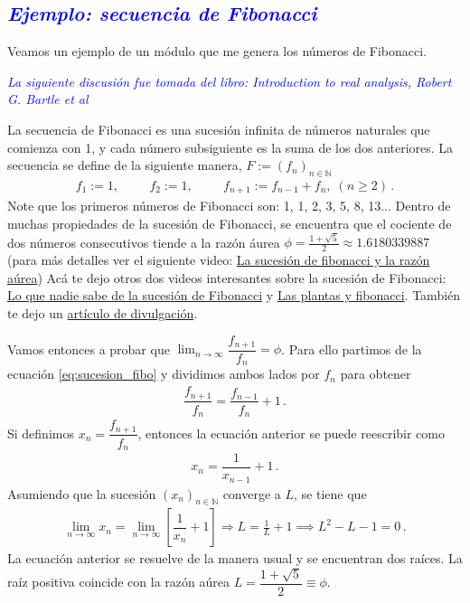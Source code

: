 \documentclass[12pt]{article}
\begin{document}
\subsection*{\textcolor{blue}{\textit{Ejemplo: secuencia de Fibonacci}}}

Veamos un ejemplo de un módulo que me genera los números de Fibonacci. 

	\noindent \textcolor{blue}{\textit{La siguiente discusión fue tomada del libro: 
	Introduction to real analysis, Robert G. Bartle et al}}

	La secuencia de Fibonacci es una sucesión infinita de números 
	naturales que comienza con 1, y cada número subsiguiente es
	la suma de los dos anteriores. 
	La secuencia se define de la siguiente manera, 
	$F:=(f_n)_{n \in \mathbb{N}}$
	\begin{align}\label{eq:sucesion_fibo}
		f_1:=1,\hspace{1cm}f_2:=1,\hspace{1cm}f_{n+1}:=f_{n-1}+f_{n},\;(n\geq 2)\,.
	\end{align}
	Note que los primeros números de Fibonacci son: 1, 1, 2, 3, 5, 8, 13...
	Dentro de muchas propiedades de la sucesión de Fibonacci, 
	se encuentra que el cociente de dos números consecutivos tiende a la razón
	áurea $\phi=\frac{1+\sqrt{5}}{2}\approx 1.6180339887$ (para más detalles 
	ver el siguiente video: \href{https://www.youtube.com/watch?v=yDyMSliKsxI}{La sucesión de fibonacci y la razón aúrea})  
	Acá te dejo otros dos videos interesantes sobre la sucesión de Fibonacci:
	\href{https://www.youtube.com/watch?v=N0gr6nK6lgU}{Lo que nadie sabe de la sucesión 
	de Fibonacci} y \href{http://youtube.com/watch?v=ctRIK56jV3k}{Las plantas y fibonacci}. 
	También te dejo un \href{https://www.bbc.com/mundo/noticias-46926506}{artículo de divulgación}.

	Vamos entonces a probar que $\lim_{n\rightarrow \infty} \dfrac{f_{n+1}}{f_n} = \phi$.
	Para ello partimos de la ecuación \eqref{eq:sucesion_fibo} 
	y dividimos ambos lados por $f_n$ para obtener
	\begin{align}
		\dfrac{f_{n+1}}{f_n} = \dfrac{f_{n-1}}{f_n}+1\,.
	\end{align}
	Si definimos $x_n=\dfrac{f_{n+1}}{f_n}$, entonces la ecuación anterior se 
	puede reescribir como
	\begin{align}
		x_n = \dfrac{1}{x_{n-1}}+1\,.
	\end{align}		
	Asumiendo que la sucesión $(x_n)_{n\in \mathbb{N}}$ converge a  $L$, 
	se tiene que 
	\begin{align}
		\lim_{n\rightarrow \infty} x_n = \lim_{n\rightarrow \infty} \left[ 
			\dfrac{1}{ x_n}+1 \right] \Rightarrow  L = \frac{1}{L} + 1 \implies 
			L^2-L-1=0 \,.
	\end{align}	
	La ecuación anterior se resuelve de la manera usual y se encuentran dos raíces.
	La raíz positiva coincide con la razón aúrea $L=\dfrac{1+\sqrt{5}}{2}\equiv\phi$.
\end{document}
